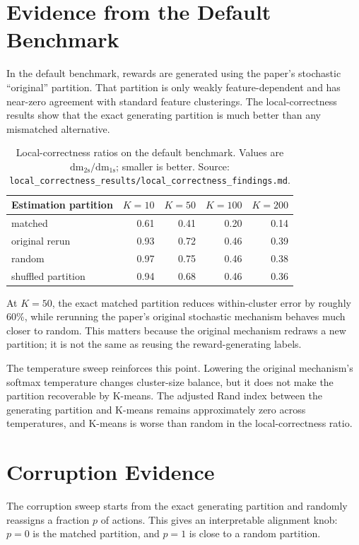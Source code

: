 \documentclass[11pt]{article}
\newcommand{\dm}{\mathrm{dm}}
\begin{document}
\section{Evidence from the Default Benchmark}

In the default benchmark, rewards are generated using the paper's stochastic
``original'' partition. That partition is only weakly feature-dependent and has
near-zero agreement with standard feature clusterings. The local-correctness
results show that the exact generating partition is much better than any
mismatched alternative.

\begin{table}[h]
\centering
\caption{Local-correctness ratios on the default benchmark. Values are
$\dm_{\mathrm{2s}}/\dm_{\mathrm{1s}}$; smaller is better. Source:
\texttt{local_correctness_results/local_correctness_findings.md}.}
\begin{tabular}{lrrrr}
\toprule
Estimation partition & $K=10$ & $K=50$ & $K=100$ & $K=200$ \\
\midrule
matched & 0.61 & 0.41 & 0.20 & 0.14 \\
original rerun & 0.93 & 0.72 & 0.46 & 0.39 \\
random & 0.97 & 0.75 & 0.46 & 0.38 \\
shuffled partition & 0.94 & 0.68 & 0.46 & 0.36 \\
\bottomrule
\end{tabular}
\end{table}

At $K=50$, the exact matched partition reduces within-cluster error by roughly
60\%, while rerunning the paper's original stochastic mechanism behaves much
closer to random. This matters because the original mechanism redraws a new
partition; it is not the same as reusing the reward-generating labels.

The temperature sweep reinforces this point. Lowering the original mechanism's
softmax temperature changes cluster-size balance, but it does not make the
partition recoverable by K-means. The adjusted Rand index between the generating
partition and K-means remains approximately zero across temperatures, and
K-means is worse than random in the local-correctness ratio.

\section{Corruption Evidence}

The corruption sweep starts from the exact generating partition and randomly
reassigns a fraction $p$ of actions. This gives an interpretable alignment knob:
$p=0$ is the matched partition, and $p=1$ is close to a random partition.
\end{document}
